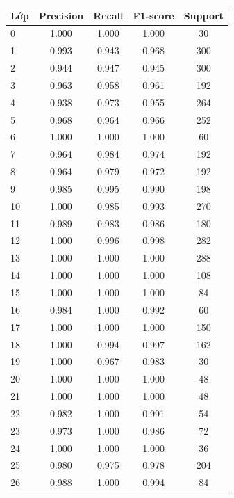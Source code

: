 \documentclass[12pt,a4paper]{article}
\begin{document}
\begin{table}[H]
\centering
\footnotesize
\begin{tabular}{@{}lcccc@{}}
\toprule
\textbf{Lớp} & \textbf{Precision} & \textbf{Recall} & \textbf{F1-score} & \textbf{Support} \\ \midrule
\rowcolor{rowgray} 0  & 1.000 & 1.000 & 1.000 & 30 \\
1  & 0.993 & 0.943 & 0.968 & 300 \\
\rowcolor{rowgray} 2  & 0.944 & 0.947 & 0.945 & 300 \\
3  & 0.963 & 0.958 & 0.961 & 192 \\
\rowcolor{rowgray} 4  & 0.938 & 0.973 & 0.955 & 264 \\
5  & 0.968 & 0.964 & 0.966 & 252 \\
\rowcolor{rowgray} 6  & 1.000 & 1.000 & 1.000 & 60 \\
7  & 0.964 & 0.984 & 0.974 & 192 \\
\rowcolor{rowgray} 8  & 0.964 & 0.979 & 0.972 & 192 \\
9  & 0.985 & 0.995 & 0.990 & 198 \\
\rowcolor{rowgray} 10 & 1.000 & 0.985 & 0.993 & 270 \\
11 & 0.989 & 0.983 & 0.986 & 180 \\
\rowcolor{rowgray} 12 & 1.000 & 0.996 & 0.998 & 282 \\
13 & 1.000 & 1.000 & 1.000 & 288 \\
\rowcolor{rowgray} 14 & 1.000 & 1.000 & 1.000 & 108 \\
15 & 1.000 & 1.000 & 1.000 & 84 \\
\rowcolor{rowgray} 16 & 0.984 & 1.000 & 0.992 & 60 \\
17 & 1.000 & 1.000 & 1.000 & 150 \\
\rowcolor{rowgray} 18 & 1.000 & 0.994 & 0.997 & 162 \\
19 & 1.000 & 0.967 & 0.983 & 30 \\
\rowcolor{rowgray} 20 & 1.000 & 1.000 & 1.000 & 48 \\
21 & 1.000 & 1.000 & 1.000 & 48 \\
\rowcolor{rowgray} 22 & 0.982 & 1.000 & 0.991 & 54 \\
23 & 0.973 & 1.000 & 0.986 & 72 \\
\rowcolor{rowgray} 24 & 1.000 & 1.000 & 1.000 & 36 \\
25 & 0.980 & 0.975 & 0.978 & 204 \\
\rowcolor{rowgray} 26 & 0.988 & 1.000 & 0.994 & 84 \\

\end{tabular}
\end{table}
\end{document}
